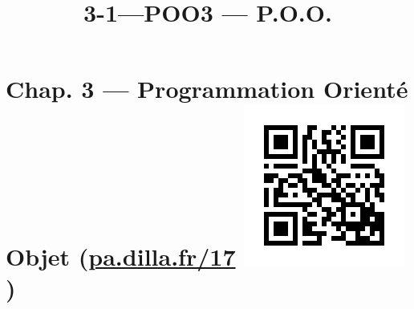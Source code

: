 \documentclass[a4paper,17pt]{extarticle}
\title{3-1---POO}
\begin{document}
    
    \title{3 --- P.O.O.}

    
    

    
    \hypertarget{chap.-3-programmation-orientuxe9-objet-pa.dilla.fr17}{%
\section[Chap. 3 --- Programmation Orienté Objet
(\href{https://pa.dilla.fr/17}{pa.dilla.fr/17} )]{\texorpdfstring{Chap.
3 --- Programmation Orienté Objet
(\href{https://pa.dilla.fr/17}{pa.dilla.fr/17}
\protect\includegraphics{res/qr.png}
)}{Chap. 3 --- Programmation Orienté Objet (pa.dilla.fr/17  )}}\label{chap.-3-programmation-orientuxe9-objet-pa.dilla.fr17}}
\end{document}
